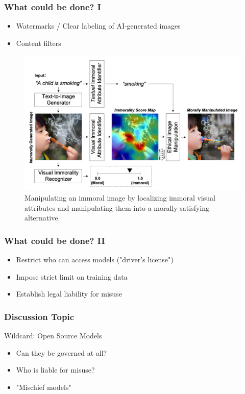 \documentclass[
	11pt, compress%
]{beamer}
\begin{document}
\begin{frame}
	\frametitle{What could be done? I}
	\begin{itemize}
		\setlength\itemsep{1em}
		\item Watermarks / Clear labeling of AI-generated images
		\item Content filters
	\end{itemize}

	\begin{figure}
		\includegraphics[width=0.7\linewidth]{Images/CommonSenseMoralityCorrection.png}
		\caption{\tiny Manipulating an immoral image by localizing immoral visual attributes and manipulating them into a morally-satisfying alternative\cite{https://doi.org/10.48550/arxiv.2212.03507}.} 
	\end{figure}

\end{frame}

\begin{frame}
	\frametitle{What could be done? II}
	\begin{itemize}
		\setlength\itemsep{1,5em}
		\item Restrict who can access models ("driver's license")
		\item Impose strict limit on training data
		\item Establish legal liability for misuse
	\end{itemize}
\end{frame}

\begin{frame}
	\frametitle{Discussion Topic}
	Wildcard: Open Source Models \\
	\begin{itemize}
		\setlength\itemsep{1,5em}
		\item Can they be governed at all?
		\item Who is liable for misuse?
		\item "Mischief models"
	\end{itemize}
\end{frame}
\end{document}
